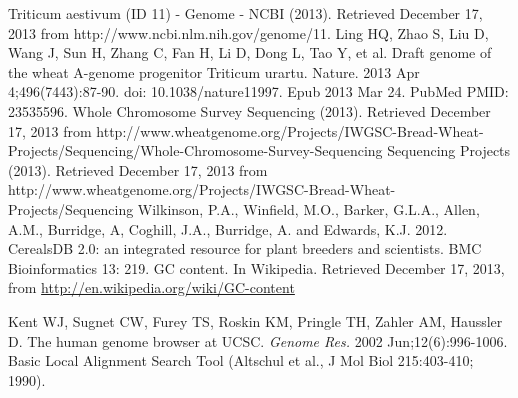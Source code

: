 \documentclass[10.9pt]{article} %
\begin{document}
%
%
\begin{thebibliography}{99}
{\small
{}
Triticum aestivum (ID 11) - Genome - NCBI (2013). Retrieved December 17, 2013 from http://www.ncbi.nlm.nih.gov/genome/11.
Ling HQ, Zhao S, Liu D, Wang J, Sun H, Zhang C, Fan H, Li D, Dong L, Tao Y, et al. Draft genome of the wheat A-genome progenitor Triticum
urartu. Nature. 2013 Apr 4;496(7443):87-90. doi: 10.1038/nature11997. Epub 2013 Mar 24. PubMed PMID: 23535596. 
Whole Chromosome Survey Sequencing (2013). Retrieved December 17, 2013 from http://www.wheatgenome.org/Projects/IWGSC-Bread-Wheat-
Projects/Sequencing/Whole-Chromosome-Survey-Sequencing
Sequencing Projects (2013). Retrieved December 17, 2013 from http://www.wheatgenome.org/Projects/IWGSC-Bread-Wheat-Projects/Sequencing
Wilkinson, P.A., Winfield, M.O., Barker, G.L.A., Allen, A.M., Burridge, A, Coghill, J.A., Burridge, A. and Edwards, K.J. 2012. CerealsDB 2.0:
an integrated resource for plant breeders and scientists. BMC Bioinformatics 13: 219.
  GC content. In Wikipedia. Retrieved December 17, 2013, from
  \url{http://en.wikipedia.org/wiki/GC-content}

    Kent WJ, Sugnet CW, Furey TS, Roskin KM, Pringle TH, Zahler AM, Haussler D. The human genome browser at UCSC. 
    \emph{Genome Res.} 2002 Jun;12(6):996-1006. 
  Basic Local Alignment Search Tool (Altschul et al., J Mol Biol 215:403-410; 1990).
}
\end{thebibliography}
\end{document}
